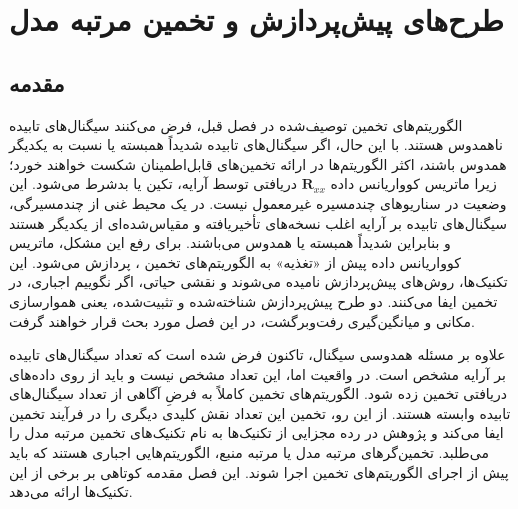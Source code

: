 

\chapter{طرح‌های پیش‌پردازش و تخمین مرتبه مدل}
\label{chap:4}

\section{مقدمه}
\label{sec:4-1}
الگوریتم‌های تخمین  توصیف‌شده در فصل قبل، فرض می‌کنند سیگنال‌های تابیده ناهمدوس هستند. با این حال، اگر سیگنال‌های تابیده شدیداً همبسته یا نسبت به یکدیگر همدوس باشند، اکثر الگوریتم‌ها در ارائه تخمین‌های قابل‌اطمینان  شکست خواهند خورد؛ زیرا ماتریس کوواریانس داده $\bm{R}_{xx}$ دریافتی توسط آرایه، تکین یا بدشرط می‌شود. این وضعیت در سناریوهای چندمسیره غیرمعمول نیست. در یک محیط غنی از چندمسیرگی، سیگنال‌های تابیده بر آرایه اغلب نسخه‌های تأخیریافته و مقیاس‌شده‌ای از یکدیگر هستند و بنابراین شدیداً همبسته یا همدوس می‌باشند. برای رفع این مشکل، ماتریس کوواریانس داده پیش از «تغذیه» به الگوریتم‌های تخمین ، پردازش می‌شود. این تکنیک‌ها، روش‌های پیش‌پردازش نامیده می‌شوند و نقشی حیاتی، اگر نگوییم اجباری، در تخمین  ایفا می‌کنند. دو طرح پیش‌پردازش شناخته‌شده و تثبیت‌شده، یعنی هموارسازی مکانی و میانگین‌گیری رفت‌وبرگشت، در این فصل مورد بحث قرار خواهند گرفت.

علاوه بر مسئله همدوسی سیگنال، تاکنون فرض شده است که تعداد سیگنال‌های تابیده بر آرایه مشخص است. در واقعیت اما، این تعداد مشخص نیست و باید از روی داده‌های دریافتی تخمین زده شود. الگوریتم‌های تخمین  کاملاً به فرضِ آگاهی از تعداد سیگنال‌های تابیده وابسته هستند. از این رو، تخمین این تعداد نقش کلیدی دیگری را در فرآیند تخمین  ایفا می‌کند و پژوهش در رده مجزایی از تکنیک‌ها به نام تکنیک‌های تخمین مرتبه مدل را می‌طلبد. تخمین‌گرهای مرتبه مدل یا مرتبه منبع، الگوریتم‌هایی اجباری هستند که باید پیش از اجرای الگوریتم‌های تخمین  اجرا شوند. این فصل مقدمه کوتاهی بر برخی از این تکنیک‌ها ارائه می‌دهد.

